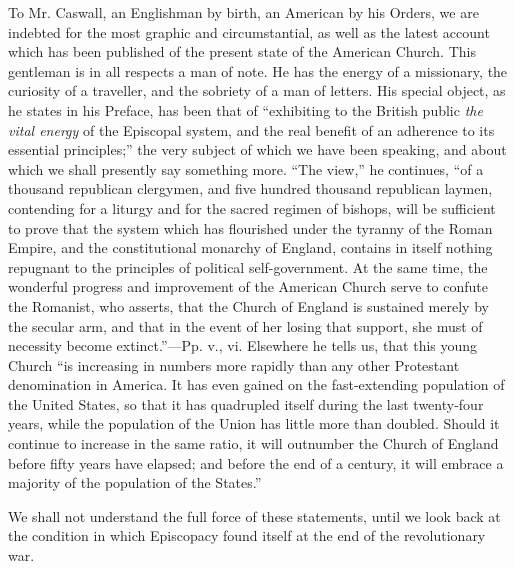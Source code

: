 To Mr. Caswall, an Englishman by birth, an
American by his Orders, we are indebted for the most graphic and
circumstantial, as well as the latest account which has been published
of the present state of the American Church. This gentleman is in all
respects a man of note. He has the energy of a missionary, the
curiosity of a traveller, and the sobriety of a man of letters. His
special object, as he states in his Preface, has been that of ``exhibiting
to the British public \emph{the vital energy} of the Episcopal system,
and the real benefit of an adherence to its essential principles;'' the
very subject of which we have been speaking, and about which we shall
presently say something more. ``The view,'' he continues, ``of a thousand
republican clergymen, and five hundred thousand republican laymen,
contending for a liturgy and for the sacred regimen of bishops, will
be sufficient to prove that the system which has flourished under the
tyranny of the Roman Empire, and the constitutional monarchy of
England, contains in itself nothing repugnant to the principles of
political self-government. At the same time, the wonderful progress
and improvement of the American Church serve to confute the Romanist,
who asserts, that the Church of England is sustained merely by the
secular arm, and that in the event of her losing that support, she
must of necessity become extinct.''—Pp. v., vi. Elsewhere he
tells us, that this young Church ``is increasing in numbers more
rapidly than any other Protestant denomination in America. It has even
gained on the fast-extending population of the United States, so that
it has quadrupled itself during the last twenty-four years, while the
population of the Union has little more than doubled. Should it
continue to increase in the same ratio, it will outnumber the Church
of England before fifty years have elapsed; and before the end of a
century, it will embrace a majority of the population of the States.''

We shall not understand the full force of these
statements, until we look back at the condition in which Episcopacy
found itself at the end of the revolutionary war.

